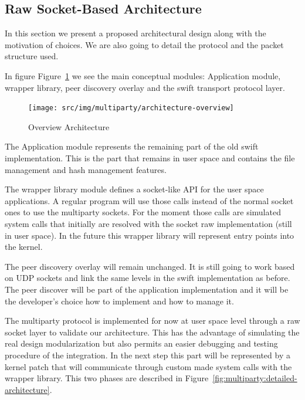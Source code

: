
\subsection{Raw Socket-Based Architecture}

In this section we present a proposed architectural design along with the
motivation of choices. We are also going to detail the protocol and the packet
structure used.

In figure Figure~\ref{fig:multiparty:architecture-overview} we see the main
conceptual modules: Application module, wrapper library, peer discovery
overlay and the swift transport protocol layer.

\begin{figure}
  \centering
  \texttt{[image: src/img/multiparty/architecture-overview]}
  \caption{Overview Architecture}
  \label{fig:multiparty:architecture-overview}
\end{figure}

The Application module represents the remaining part of the old swift
implementation. This is the part that remains in user space and contains the
file management and hash management features. 

The wrapper library module defines a socket-like API for the user space
applications. A regular program will use those calls instead of the normal
socket ones to use the multiparty sockets. For the moment those calls are
simulated system calls that initially are resolved with the socket raw
implementation (still in user space). In the future this wrapper library
will represent entry points into the kernel.

The peer discovery overlay will remain unchanged. It is still going to work
based on UDP sockets and link the same levels in the swift implementation as
before. The peer discover will be part of the application implementation and
it will be the developer's choice how to implement and how to manage it.

The multiparty protocol is implemented for now at user space level through a raw
socket layer to validate our architecture. This has the advantage of
simulating the real design modularization but also permits an easier debugging
and testing procedure of the integration. In the next step this part will be
represented by a kernel patch that will communicate through custom made system
calls with the wrapper library. This two phases are described in
Figure~\ref{fig:multiparty:detailed-architecture}.

